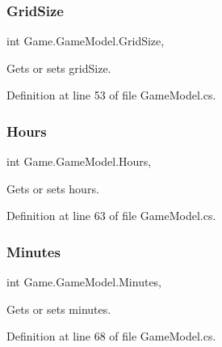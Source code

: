 \subsubsection{\texorpdfstring{GridSize}{GridSize}}
{\footnotesize\ttfamily int Game.\+Game\+Model.\+Grid\+Size\hspace{0.3cm}{\ttfamily [get]}, {\ttfamily [set]}}



Gets or sets grid\+Size. 



Definition at line 53 of file Game\+Model.\+cs.

\mbox{\label{class_game_1_1_game_model_a0eaa30ff6e7b136f27f973610ea6277b}} 
\subsubsection{\texorpdfstring{Hours}{Hours}}
{\footnotesize\ttfamily int Game.\+Game\+Model.\+Hours\hspace{0.3cm}{\ttfamily [get]}, {\ttfamily [set]}}



Gets or sets hours. 



Definition at line 63 of file Game\+Model.\+cs.

\mbox{\label{class_game_1_1_game_model_a6a07136158c57f25dc9fb8a54ddf0536}} 
\subsubsection{\texorpdfstring{Minutes}{Minutes}}
{\footnotesize\ttfamily int Game.\+Game\+Model.\+Minutes\hspace{0.3cm}{\ttfamily [get]}, {\ttfamily [set]}}



Gets or sets minutes. 



Definition at line 68 of file Game\+Model.\+cs.

\mbox{\label{class_game_1_1_game_model_abbe450e31b940844f94cd3d9cec2f50f}} 
